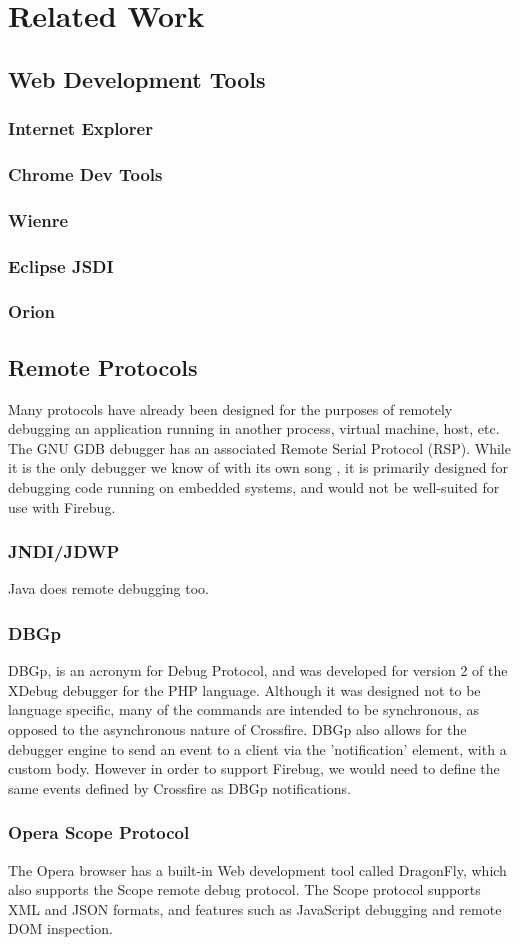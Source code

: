 
\section{Related Work}
\subsection{Web Development Tools}
\subsubsection{Internet Explorer}
\subsubsection{Chrome Dev Tools}
\subsubsection{Wienre}
\subsubsection{Eclipse JSDI}
\subsubsection{Orion}
\subsection{Remote Protocols}
Many protocols have already been designed for the purposes of remotely debugging
an application running in another process, virtual machine, host, etc. The GNU
GDB debugger has an associated Remote Serial Protocol (RSP)\cite{gdb-rsp}. While
it is the only debugger we know of with its own song \cite{gdb-song}, it is
primarily designed for debugging code running on embedded systems, and would not be
well-suited for use with Firebug.
\subsubsection{JNDI/JDWP}
Java does remote debugging too.
\subsubsection{DBGp}
DBGp\cite{dbgp}, is an acronym for Debug Protocol, and was developed for version
2 of the XDebug debugger for the PHP language. Although it was designed not to
be language specific, many of the commands are intended to be synchronous, as
opposed to the asynchronous nature of Crossfire. DBGp also allows for the
debugger engine to send an event to a client via the 'notification' element,
with a custom body. However in order to support Firebug, we would need to define
the same events defined by Crossfire as DBGp notifications.
\subsubsection{Opera Scope Protocol}
The Opera browser has a built-in Web development tool called DragonFly,
which also supports the Scope remote debug protocol. The Scope protocol supports
XML and JSON formats, and features such as JavaScript debugging and remote DOM
inspection.
\cite{opera-scope}


